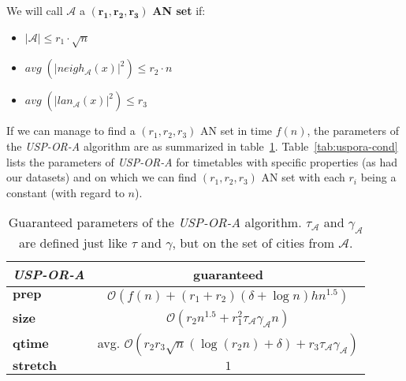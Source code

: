 \documentclass{svk_long_en}
\begin{document}
		We will call $\mathcal{A}$ a $\bm{(r_{1}, r_{2}, r_{3})}$ \textbf{AN set} if:
		\begin{itemize}
			\item $|\mathcal{A}| \leq r_{1} \cdot \sqrt{n}$
			\item $avg \; (|neigh_{\mathcal{A}}(x)|^{2}) \leq r_{2} \cdot n$
			\item $avg \; (|lan_{\mathcal{A}}(x)|^{2}) \leq r_{3}$
		\end{itemize}
		\hspace{\fill}
		
		If we can manage to find a $(r_{1}, r_{2}, r_{3})$ AN set in time $f(n)$, the parameters of the \textit{USP-OR-A} algorithm are as summarized in table~\ref{tab:uspora-guar}. Table~\ref{tab:uspora-cond} lists the parameters of \textit{USP-OR-A} for timetables with specific properties (as had our datasets) and on which we can find $(r_{1}, r_{2}, r_{3})$ AN set with each $r_{i}$ being a constant (with regard to $n$).
		
		\begin{table}[h!]
			\centering
			\footnotesize
			\begin{tabular}{l|c}
				\cellcolor{oracle-clr} \textit{\textbf{USP-OR-A}} & 
				\cellcolor{oracle-clr} \textbf{guaranteed} \\
				\hline
				\cellcolor{oracle-clr} $\bm{prep}$ & $\mathcal{O}(f(n) + (r_{1} + r_{2}) (\delta + \log n) h n^{1.5})$ \\
				\cellcolor{oracle-clr} $\bm{size}$ & $\mathcal{O}(r_{2} n^{1.5} + r_{1}^{2} \tau_{\mathcal{A}} \gamma_{\mathcal{A}} n)$ \\
				\cellcolor{oracle-clr} $\bm{qtime}$ & avg. $\mathcal{O}(r_{2} r_{3} \sqrt{n} (\log (r_{2}n) + \delta) + r_{3} \tau_{\mathcal{A}} \gamma_{\mathcal{A}})$ \\
				\cellcolor{oracle-clr} $\bm{stretch}$ & $1$ \\
			\end{tabular}
			\caption{\label{tab:uspora-guar} Guaranteed parameters of the \textit{USP-OR-A} algorithm. $\tau_{\mathcal{A}}$ and $\gamma_{\mathcal{A}}$ are defined just like $\tau$ and $\gamma$, but on the set of cities from $\mathcal{A}$.}
		\end{table}
		
\end{document}
